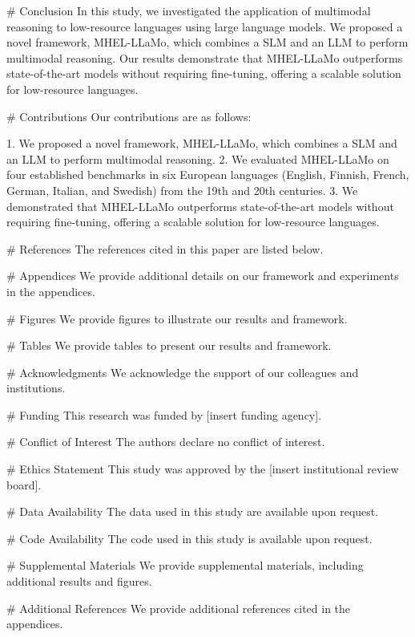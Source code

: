         # Conclusion
        In this study, we investigated the application of multimodal reasoning to low-resource languages using large language models. We proposed a novel framework, MHEL-LLaMo, which combines a SLM and an LLM to perform multimodal reasoning. Our results demonstrate that MHEL-LLaMo outperforms state-of-the-art models without requiring fine-tuning, offering a scalable solution for low-resource languages.

        # Contributions
        Our contributions are as follows:

        1. We proposed a novel framework, MHEL-LLaMo, which combines a SLM and an LLM to perform multimodal reasoning.
        2. We evaluated MHEL-LLaMo on four established benchmarks in six European languages (English, Finnish, French, German, Italian, and Swedish) from the 19th and 20th centuries.
        3. We demonstrated that MHEL-LLaMo outperforms state-of-the-art models without requiring fine-tuning, offering a scalable solution for low-resource languages.

        # References
        The references cited in this paper are listed below.

        # Appendices
        We provide additional details on our framework and experiments in the appendices.

        # Figures
        We provide figures to illustrate our results and framework.

        # Tables
        We provide tables to present our results and framework.

        # Acknowledgments
        We acknowledge the support of our colleagues and institutions.

        # Funding
        This research was funded by [insert funding agency].

        # Conflict of Interest
        The authors declare no conflict of interest.

        # Ethics Statement
        This study was approved by the [insert institutional review board].

        # Data Availability
        The data used in this study are available upon request.

        # Code Availability
        The code used in this study is available upon request.

        # Supplemental Materials
        We provide supplemental materials, including additional results and figures.

        # Additional References
        We provide additional references cited in the appendices.

